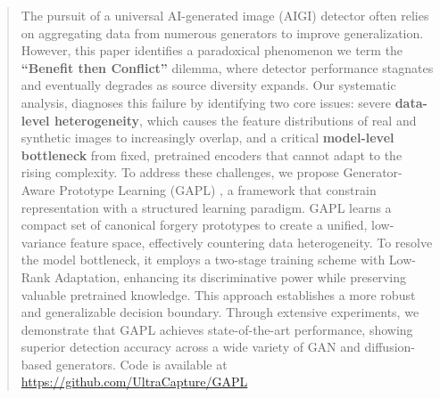 
\begin{abstract}
The pursuit of a universal AI-generated image (AIGI) detector often relies on aggregating data from numerous generators to improve generalization.
%
However, this paper identifies a paradoxical phenomenon we term the \textbf{``Benefit then Conflict''} dilemma, where detector performance stagnates and eventually degrades as source diversity expands.
%
Our systematic analysis, diagnoses this failure by identifying two core issues: severe \textbf{data-level heterogeneity}, which causes the feature distributions of real and synthetic images to increasingly overlap, and a critical \textbf{model-level bottleneck} from fixed, pretrained encoders that cannot adapt to the rising complexity.
%
To address these challenges, we propose Generator-Aware Prototype Learning (GAPL) , a framework that constrain representation with a structured learning paradigm.
%
GAPL learns a compact set of canonical forgery prototypes to create a unified, low-variance feature space, effectively countering data heterogeneity.
%
To resolve the model bottleneck, it employs a two-stage training scheme with Low-Rank Adaptation, enhancing its discriminative power while preserving valuable pretrained knowledge.
%
This approach establishes a more robust and generalizable decision boundary. Through extensive experiments, we demonstrate that GAPL achieves state-of-the-art performance, showing superior detection accuracy across a wide variety of GAN and diffusion-based generators. Code is available at \url{https://github.com/UltraCapture/GAPL}
\end{abstract}
